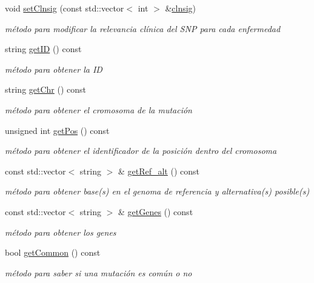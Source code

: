 \begin{DoxyCompactItemize}
void \hyperlink{classmutacion_aed8c1aedd3468bf27bafab931d576454}{set\+Clnsig} (const std\+::vector$<$ int $>$ \&\hyperlink{classmutacion_a0d029eee6925649df15081b780c12e37}{clnsig})
\begin{DoxyCompactList}\small\item\em método para modificar la relevancia clínica del S\+NP para cada enfermedad \end{DoxyCompactList}\item 
string \hyperlink{classmutacion_a6e3fa261f38b413aff9172fe065da8b8}{get\+ID} () const 
\begin{DoxyCompactList}\small\item\em método para obtener la ID \end{DoxyCompactList}\item 
string \hyperlink{classmutacion_aefb0a9a6a8278f0d192ebc044198399c}{get\+Chr} () const 
\begin{DoxyCompactList}\small\item\em método para obtener el cromosoma de la mutación \end{DoxyCompactList}\item 
unsigned int \hyperlink{classmutacion_ad08cb3c30da4195adc3c22d0b4c8edd7}{get\+Pos} () const 
\begin{DoxyCompactList}\small\item\em método para obtener el identificador de la posición dentro del cromosoma \end{DoxyCompactList}\item 
const std\+::vector$<$ string $>$ \& \hyperlink{classmutacion_ad2e2452d29875aeed6dff7a98327135a}{get\+Ref\+\_\+alt} () const 
\begin{DoxyCompactList}\small\item\em método para obtener base(s) en el genoma de referencia y alternativa(s) posible(s) \end{DoxyCompactList}\item 
const std\+::vector$<$ string $>$ \& \hyperlink{classmutacion_a547be4b8d179d85cf46e7c311ce354c1}{get\+Genes} () const 
\begin{DoxyCompactList}\small\item\em método para obtener los genes \end{DoxyCompactList}\item 
bool \hyperlink{classmutacion_abc353016535a561fbd8e902c83861228}{get\+Common} () const 
\begin{DoxyCompactList}\small\item\em método para saber si una mutación es común o no \end{DoxyCompactList}\item 

\end{DoxyCompactItemize}
